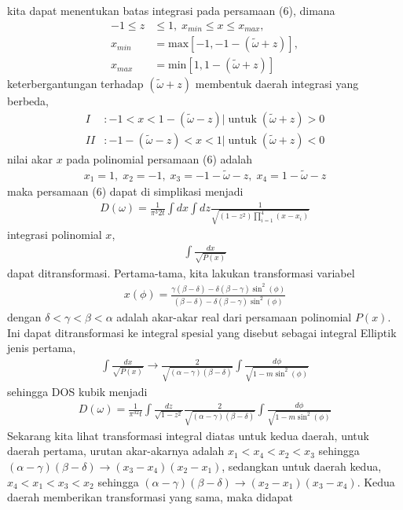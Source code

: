 kita dapat menentukan batas integrasi pada persamaan (6), dimana
\begin{align}
-1 \leq z &\leq 1, \; x_{min} \leq x \leq x_{max},\\
x_{min} &= \text{max}[-1,-1-(\tilde{\omega}+z)],\\
x_{max} &= \text{min}[1,1-(\tilde{\omega} + z)]
\end{align}
keterbergantungan terhadap $(\tilde{\omega} + z)$ membentuk daerah integrasi yang berbeda,
\begin{align}
I &: -1 < x < 1 - (\tilde{\omega} - z) | \; \text{untuk} \; (\tilde{\omega} + z) > 0 \\
II &: -1 - (\tilde{\omega} - z) < x < 1 | \; \text{untuk} \; (\tilde{\omega} + z) < 0
\end{align}
nilai akar $x$ pada polinomial persamaan (6) adalah
\begin{align}
x_1 = 1, \; x_2 = -1, \; x_3 = -1 - \tilde{\omega} - z, \; x_4 = 1 - \tilde{\omega} - z 
\end{align}
maka persamaan (6) dapat di simplikasi menjadi
\begin{align}
D(\omega) = \frac{1}{\pi^3 2t}\int dx \int dz \frac{1}{\sqrt{(1-z^2)\prod_{i=1}^4 ( x - x_i )}}
\end{align}
integrasi polinomial $x$,
\begin{align}
\int \frac{dx}{\sqrt{P(x)}}
\end{align}
dapat ditransformasi. Pertama-tama, kita lakukan transformasi variabel
\begin{align}
x(\phi) = \frac{\gamma(\beta - \delta) - \delta(\beta - \gamma)\sin^2(\phi)}{(\beta-\delta) - \delta(\beta - \gamma)\sin^2(\phi)}
\end{align}
dengan $\delta < \gamma < \beta < \alpha$ adalah akar-akar real dari persamaan polinomial $P(x)$. Ini dapat ditransformasi ke integral spesial yang disebut sebagai integral Elliptik jenis pertama,
\begin{align}
\int \frac{dx}{\sqrt{P(x)}} \rightarrow \frac{2}{\sqrt{(\alpha - \gamma)(\beta - \delta)}}\int \frac{d\phi}{\sqrt{1 - m\sin^2(\phi)}}
\end{align}
sehingga DOS kubik menjadi
\begin{align}
D(\omega) = \frac{1}{\pi^32t}\int \frac{dz}{\sqrt{1-z^2}}\frac{2}{\sqrt{(\alpha - \gamma)(\beta -\delta)}} \int \frac{d\phi}{\sqrt{1 - m\sin^2(\phi)}}
\end{align}
Sekarang kita lihat transformasi integral diatas untuk kedua daerah, untuk daerah pertama, urutan akar-akarnya adalah $x_1 < x_4 < x_2 < x_3$ sehingga $(\alpha - \gamma)(\beta -\delta) \rightarrow (x_3 - x_4)(x_2 - x_1)$, sedangkan untuk daerah kedua, $x_4 < x_1 < x_3 < x_2$ sehingga $(\alpha - \gamma)(\beta -\delta) \rightarrow (x_2 - x_1)(x_3 - x_4)$. Kedua daerah memberikan transformasi yang sama, maka didapat
